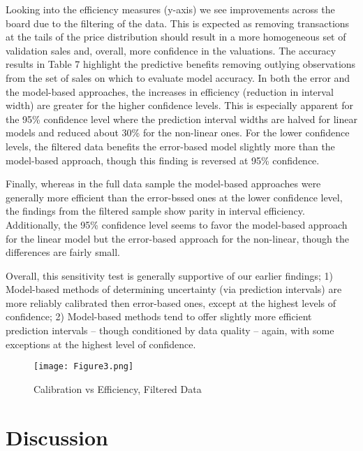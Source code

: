 \documentclass[colTwo]{anon}
\theoremstyle{definition}
\begin{document}
Looking into the efficiency measures (y-axis) we see improvements across the board due to the filtering of the data.  This is expected as removing transactions at the tails of the price distribution should result in a more homogeneous set of validation sales and, overall, more confidence in the valuations.  The accuracy results in Table 7 highlight the predictive benefits removing outlying observations from the set of sales on which to evaluate model accuracy. In both the error and the model-based approaches, the increases in efficiency (reduction in interval width) are greater for the higher confidence levels.  This is especially apparent for the 95\% confidence level where the prediction interval widths are halved for linear models and reduced about 30\% for the non-linear ones.  For the lower confidence levels, the filtered data benefits the error-based model slightly more than the model-based approach, though this finding is reversed at 95\% confidence.  

Finally, whereas in the full data sample the model-based approaches were generally more efficient than the error-bssed ones at the lower confidence level, the findings from the filtered sample show parity in interval efficiency.  Additionally, the 95\% confidence level seems to favor the model-based approach for the linear model but the error-based approach for the non-linear, though the differences are fairly small.  

Overall, this sensitivity test is generally supportive of our earlier findings; 1) Model-based methods of determining uncertainty (via prediction intervals) are more reliably calibrated then error-based ones, except at the highest levels of confidence; 2) Model-based methods tend to offer slightly more efficient prediction intervals -- though conditioned by data quality -- again, with some exceptions at the highest level of confidence.  

\begin{figure*}[h!]
\centering
\texttt{[image: Figure3.png]}
\caption{Calibration vs Efficiency, Filtered Data}
\label{fig:calibsens}
\end{figure*}

\section{Discussion}
\end{document}
